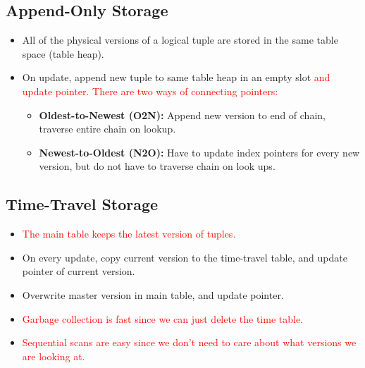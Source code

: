 \documentclass[11pt]{article}
\newcommand{\rr}[1]{\textcolor{red}{#1}}
\begin{document}
\subsection*{Append-Only Storage}
    \begin{itemize}
        \item
        All of the physical versions of a logical tuple are stored in the same table space 
        (table heap).
        
        \item
        On update, append new tuple to same table heap in an empty slot \rr{and update pointer. There are two ways of connecting pointers:}
        \begin{itemize}
            \item \textbf{Oldest-to-Newest (O2N):}
        Append new version to end of chain, traverse entire chain on lookup.
        
        \item \textbf{Newest-to-Oldest (N2O):}
        Have to update index pointers for every new version, but do not have to traverse chain on 
        look ups.
        \end{itemize}
\end{itemize}

\subsection*{Time-Travel Storage}
\begin{itemize}
    \item \rr{The main table keeps the latest version of tuples.}
    \item
    On every update, copy current version to the time-travel table, and update pointer of current version.
    \item
    Overwrite master version in main table, and update pointer.
    \item
    \rr{Garbage collection is fast since we can just delete the time table.}
    \item \rr{Sequential scans are easy since we don't need to care about what versions we are looking at.}
\end{itemize}

\end{document}

